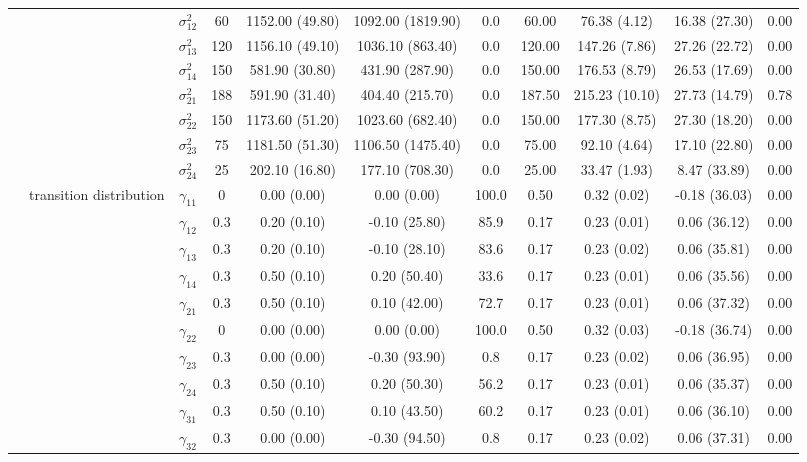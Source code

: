 \begin{table}[h]
{\begin{tabular}{ccccccccccc}
 &  & $\sigma^2_{12}$ & 60 & 1152.00 (49.80) & 1092.00 (1819.90) & 0.0 & 60.00 & 76.38 (4.12) & 16.38 (27.30) & 0.00 \\
 &  & $\sigma^2_{13}$ & 120 & 1156.10 (49.10) & 1036.10 (863.40) & 0.0 & 120.00 & 147.26 (7.86) & 27.26 (22.72) & 0.00 \\
 &  & $\sigma^2_{14}$ & 150 & 581.90 (30.80) & 431.90 (287.90) & 0.0 & 150.00 & 176.53 (8.79) & 26.53 (17.69) & 0.00 \\
 &  & $\sigma^2_{21}$ & 188 & 591.90 (31.40) & 404.40 (215.70) & 0.0 & 187.50 & 215.23 (10.10) & 27.73 (14.79) & 0.78 \\
 &  & $\sigma^2_{22}$ & 150 & 1173.60 (51.20) & 1023.60 (682.40) & 0.0 & 150.00 & 177.30 (8.75) & 27.30 (18.20) & 0.00 \\
 &  & $\sigma^2_{23}$ & 75 & 1181.50 (51.30) & 1106.50 (1475.40) & 0.0 & 75.00 & 92.10 (4.64) & 17.10 (22.80) & 0.00 \\
 &  & $\sigma^2_{24}$ & 25 & 202.10 (16.80) & 177.10 (708.30) & 0.0 & 25.00 & 33.47 (1.93) & 8.47 (33.89) & 0.00 \\
 & transition distribution & $\gamma_{11}$ & 0 & 0.00 (0.00) & 0.00 (0.00) & 100.0 & 0.50 & 0.32 (0.02) & -0.18 (36.03) & 0.00 \\
 & \multirow{15}{*}{} & $\gamma_{12}$ & 0.3 & 0.20 (0.10) & -0.10 (25.80) & 85.9 & 0.17 & 0.23 (0.01) & 0.06 (36.12) & 0.00 \\
 &  & $\gamma_{13}$ & 0.3 & 0.20 (0.10) & -0.10 (28.10) & 83.6 & 0.17 & 0.23 (0.02) & 0.06 (35.81) & 0.00 \\
 &  & $\gamma_{14}$ & 0.3 & 0.50 (0.10) & 0.20 (50.40) & 33.6 & 0.17 & 0.23 (0.01) & 0.06 (35.56) & 0.00 \\
 &  & $\gamma_{21}$ & 0.3 & 0.50 (0.10) & 0.10 (42.00) & 72.7 & 0.17 & 0.23 (0.01) & 0.06 (37.32) & 0.00 \\
 &  & $\gamma_{22}$ & 0 & 0.00 (0.00) & 0.00 (0.00) & 100.0 & 0.50 & 0.32 (0.03) & -0.18 (36.74) & 0.00 \\
 &  & $\gamma_{23}$ & 0.3 & 0.00 (0.00) & -0.30 (93.90) & 0.8 & 0.17 & 0.23 (0.02) & 0.06 (36.95) & 0.00 \\
 &  & $\gamma_{24}$ & 0.3 & 0.50 (0.10) & 0.20 (50.30) & 56.2 & 0.17 & 0.23 (0.01) & 0.06 (35.37) & 0.00 \\
 &  & $\gamma_{31}$ & 0.3 & 0.50 (0.10) & 0.10 (43.50) & 60.2 & 0.17 & 0.23 (0.01) & 0.06 (36.10) & 0.00 \\
 &  & $\gamma_{32}$ & 0.3 & 0.00 (0.00) & -0.30 (94.50) & 0.8 & 0.17 & 0.23 (0.02) & 0.06 (37.31) & 0.00 \\

\end{tabular}}
\end{table}
